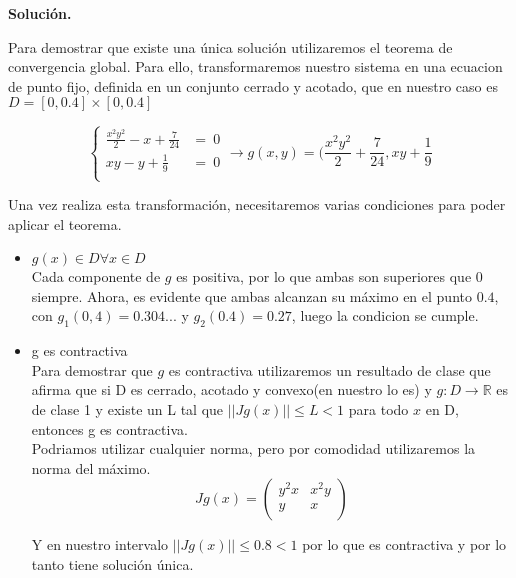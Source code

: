 \documentclass[11pt]{article}
\begin{document}
\textbf{Solución.}

Para demostrar que existe una única solución utilizaremos el teorema de
convergencia global. Para ello, transformaremos nuestro sistema en una ecuacion
de punto fijo, definida en un conjunto cerrado y acotado, que en nuestro caso
es $D = [0,0.4]\times[0,0.4]$

$$\begin{cases}
\frac{x^2y^2}{2} - x + \frac{7}{24} &= \ 0 \\
xy - y + \frac{1}{9} &= \ 0\\
\end{cases} \longrightarrow g(x,y) = (\frac{x^2y^2}{2} + \frac{7}{24}, xy +
\frac{1}{9} $$

Una vez realiza esta transformación, necesitaremos varias condiciones para poder
aplicar el teorema.
\begin{itemize}
        \item $g(x) \in D \forall x \in D$\\
        Cada componente de $g$ es positiva, por lo que ambas son superiores que
        $0$ siempre. Ahora, es evidente que ambas alcanzan su máximo en el punto
        $0.4$, con $g_1(0,4) = 0.304...$ y $g_2(0.4) = 0.27$, luego la condicion
        se cumple.
        \item g es contractiva\\
        Para demostrar que $g$ es contractiva utilizaremos un resultado de clase
        que afirma que si D es cerrado, acotado y convexo(en nuestro lo es) y
        $g:D \rightarrow \mathds{R}$ es de clase 1 y existe un L tal que
        $||Jg(x)|| \leq L < 1$ para todo $x$ en D, entonces g es contractiva.\\
        Podriamos utilizar cualquier norma, pero por comodidad utilizaremos la
        norma del máximo.
        $$Jg(x) =\begin{pmatrix}
 y^2x & x^2y    \\
 y    & x       \\
\end{pmatrix}        $$

Y en nuestro intervalo $||Jg(x)|| \leq 0.8 <1$ por lo que es contractiva y por lo tanto tiene solución única.
\end{itemize}
\end{document}
